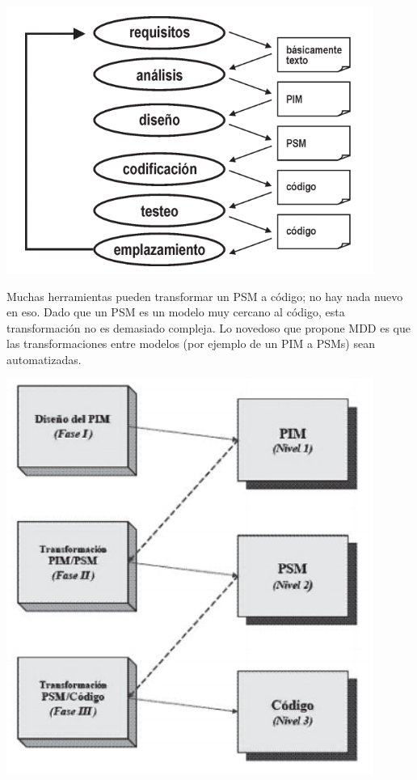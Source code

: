 \begin{flushleft}
\begin{itemize}
\begin{center}
    \includegraphics[width=12cm]{./Imagenes/mdd4}
    \end{center}

Muchas herramientas pueden transformar un PSM a código; no hay nada nuevo en eso. Dado que un PSM es un modelo muy cercano al código, esta transformación no es demasiado compleja. Lo novedoso que propone MDD es que las transformaciones entre modelos (por ejemplo de un PIM a PSMs) sean automatizadas.

\begin{center}
    \includegraphics[width=12cm]{./Imagenes/mdd5}
    \end{center}


\end{itemize}
\end{flushleft}

